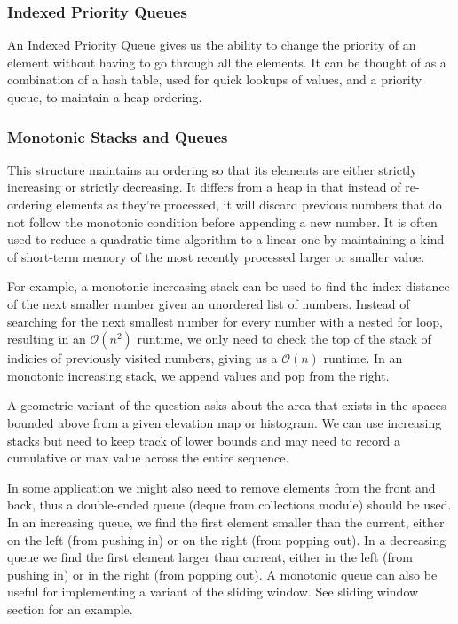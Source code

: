 \documentclass{article}
\newcommand{\bigO}{\mathcal{O}}
\begin{document}
    \subsubsection{Indexed Priority Queues}
    An Indexed Priority Queue gives us the ability to change the priority of an element without having to go through all the elements. It can be thought of as a combination of a hash table, used for quick lookups of values, and a priority queue, to maintain a heap ordering.

    \subsubsection{Monotonic Stacks and Queues}
    This structure maintains an ordering so that its elements are either strictly increasing or strictly decreasing. It differs from a heap in that instead of re-ordering elements as they're processed, it will discard previous numbers that do not follow the monotonic condition before appending a new number. It is often used to reduce a quadratic time algorithm to a linear one by maintaining a kind of short-term memory of the most recently processed larger or smaller value.
    
    For example, a monotonic increasing stack can be used to find the index distance of the next smaller number given an unordered list of numbers. Instead of searching for the next smallest number for every number with a nested for loop, resulting in an $\bigO(n^2)$ runtime, we only need to check the top of the stack of indicies of previously visited numbers, giving us a $\bigO(n)$ runtime. In an monotonic increasing stack, we append values and pop from the right. 
    
    A geometric variant of the question asks about the area that exists in the spaces bounded above from a given elevation map or histogram. We can use increasing stacks but need to keep track of lower bounds and may need to record a cumulative or max value across the entire sequence.
    
    In some application we might also need to remove elements from the front and back, thus a double-ended queue (deque from collections module) should be used. In an increasing queue, we find the first element smaller than the current, either on the left (from pushing in) or on the right (from popping out). In a decreasing queue we find the first element larger than current, either in the left (from pushing in) or in the right (from popping out). A monotonic queue can also be useful for implementing a variant of the sliding window. See sliding window section for an example.
    
\end{document}

